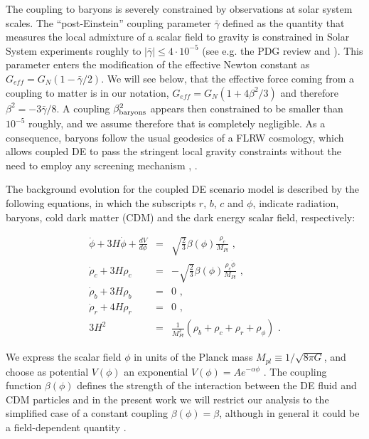 The coupling to baryons is severely constrained by observations at solar system scales.
The ``post-Einstein'' coupling parameter $\bar{\gamma}$ defined as the quantity that
measures the local admixture of a scalar field to gravity is
constrained in Solar System experiments  roughly to
$|\bar{\gamma}|\le4\cdot10^{-5}$ (see e.g. the PDG review \cite{Agashe:2014kda}
and \citep{Will_2005,Bertotti_Iess_Tortora_2003}). 
This parameter enters the modification
of the effective Newton constant as $G_{eff}=G_{N}(1-\bar{\gamma}/2)$. 
We will see below, that the effective force coming from a coupling to matter is
in our notation, $G_{eff}=G_{N}(1+4\beta^{2}/3)$
and therefore $\beta^{2}=-3\bar{\gamma}/8$. A coupling $\beta_{\rm baryons}^{2}$
appears then constrained to be smaller than $10^{-5}$ roughly, and
we assume therefore that is completely negligible. As a consequence,
baryons follow the usual geodesics of a FLRW cosmology, which allows
coupled DE to pass the stringent local gravity constraints without
the need to employ any screening mechanism \citep{2015arXiv150203888H}, 
.

The background evolution for the coupled DE scenario model is described
by the following equations, in which the subscripts $r$, $b$, $c$
and $\phi$, indicate radiation, baryons, cold dark matter (CDM) and
the dark energy scalar field, respectively:

\begin{eqnarray}
\ddot{\phi}+3H\dot{\phi}+\frac{dV}{d\phi} & = & \sqrt{\frac{2}{3}}\beta(\phi)\frac{\rho_{c}}{M_{Pl}}\,\,,\label{eq:quint-kleingordon}\\
\dot{\rho}_{c}+3H\rho_{c} & = & -\sqrt{\frac{2}{3}}\beta(\phi)\frac{\rho_{c}\dot{\phi}}{M_{Pl}}\,\,,\label{eq:cdm-back-density}\\
\dot{\rho}_{b}+3H\rho_{b} & = & 0\,\,,\\
\dot{\rho}_{r}+4H\rho_{r} & = & 0\,\,,\\
3H^{2} & = & \frac{1}{M_{Pl}^{2}}(\rho_{b}+\rho_{c}+\rho_{r}+\rho_{\phi})\,\,.
\end{eqnarray}


We express the scalar field $\phi$ in units of the Planck
mass $M_{pl}\equiv1/\sqrt{8\pi G}$, and choose as potential $V(\phi)$
an exponential $V(\phi)=Ae^{-\alpha\phi}$ \citep{Lucchin_Matarrese_1984,Wetterich_1988}.
The coupling function $\beta(\phi)$ defines the strength of the interaction
between the DE fluid and CDM particles and in the present work we
will restrict our analysis to the simplified case of a constant coupling
$\beta(\phi)=\beta$, although in general it could be a field-dependent
quantity \cite{Amendola_2004,Baldi_2011a}.

